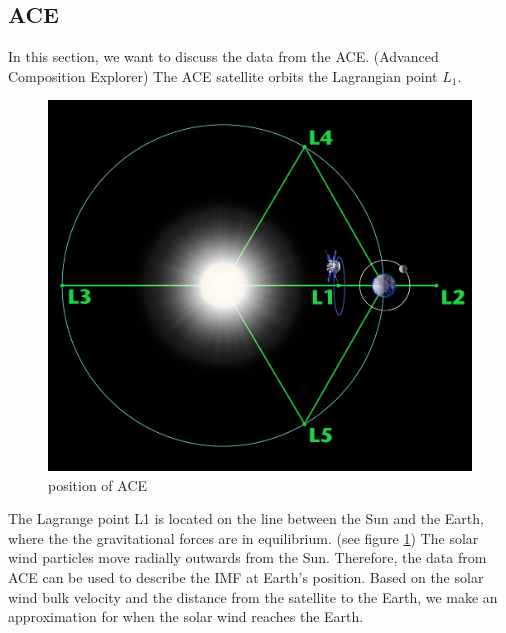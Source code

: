 \documentclass[10pt,a4paper]{article}
\begin{document}
\subsection{ACE \label{0_CHAPTER_ACE}}
In this section, we want to discuss the data from the ACE. (Advanced Composition Explorer)
The ACE satellite orbits the Lagrangian point $L_1$.
\begin{figure}[h]
\centering
\includegraphics[scale=0.06]{ACEposition.jpg}
\caption{position of ACE \cite{Link2} }
\label{position of ACE}
\end{figure}

The Lagrange point L1 is located on the line between the Sun and the Earth, where the the gravitational forces are in equilibrium. (see figure \ref{position of ACE}) The solar wind particles move radially outwards from the Sun. Therefore, the data from ACE can be used to describe the IMF at Earth's position. Based on the solar wind bulk velocity and the distance from the satellite to the Earth, we make an approximation for when the solar wind reaches the Earth.
\end{document}
